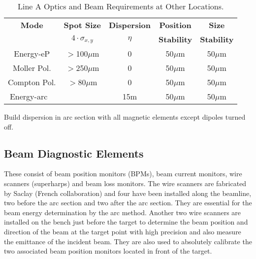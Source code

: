 {
\setcounter{footnotetmp1}{\value{footnote}}
\setcounter{footnotetmp2}{\value{footnotetmp1}}
\begin{table}[h]
\begin{center}
\begin{tabular}{|c|c|c|c|c|} \hline
{\bf Mode} & {\bf Spot Size} & {\bf Dispersion} & {\bf Position} & {\bf Size} \\
& {\bf $4\cdot{}\sigma_{x,y}$} & {\bf $\eta$} & {\bf Stability} & {\bf Stability} \\ \hline
Energy-eP  {\color{red}} & $>$100$\mu$m & 0 & 50$\mu$m & 50$\mu$m \\ \hline
Moller Pol.{\color{red}} & $>$250$\mu$m & 0 & 50$\mu$m & 50$\mu$m \\ \hline
Compton Pol.  & $>$80$\mu$m & 0 & 50$\mu$m & 50$\mu$m \\ \hline
Energy-arc {\color{red}~} && 15m & 50$\mu$m & 50$\mu$m \\ \hline
\end{tabular}
\end{center}
\caption[Beamline: Optics Requirements Other]{ Line A Optics and
         Beam Requirements at Other Locations.
}
\label{beam_tab4}
\end{table}
\addtocounter{footnote}{2}
\footnotetext[\value{footnotetmp1}]{Destructive measurements.}
\footnotetext[\value{footnotetmp2}]{Build dispersion in arc section with all 
             magnetic elements except dipoles turned off.}

Build dispersion in arc section with all magnetic elements except
dipoles turned off.

\subsection{Beam Diagnostic Elements}

These consist of beam position monitors (BPMs), beam current monitors,  wire 
scanners (superharps) and beam loss monitors. 
The wire scanners are fabricated by Saclay (French 
collaboration) and four have been installed along the beamline, two before 
the arc section and two after the arc section. They are essential for the 
beam energy determination by the arc method. Another two wire scanners are
installed on the bench just before the target to determine the beam 
position and direction of the beam at the target point with high precision 
and also measure the emittance of the incident beam. They are also used to  
absolutely calibrate the two associated beam position monitors located  in 
front of the target. 

}
